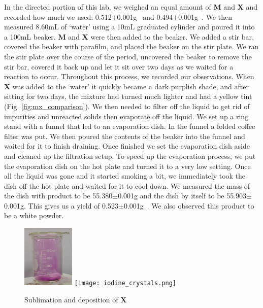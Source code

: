 \documentclass[titlepage]{article}
\begin{document}
In the directed portion of this lab, we weighed an equal amount of \textbf{M} and \textbf{X} and recorded how much we used: 0.512$\pm$0.001\unit{\gram{}} and 0.494$\pm$0.001\unit{\gram{}}. We then measured 8.60\unit{\milli\liter} of `water' using a 10\unit{\milli\liter} graduated cylinder and poured it into a 100\unit{\milli\liter} beaker. \textbf{M} and \textbf{X} were then added to the beaker. We added a stir bar, covered the beaker with parafilm, and placed the beaker on the stir plate. We ran the stir plate over the course of the period, uncovered the beaker to remove the stir bar, covered it back up and let it sit over two days as we waited for a reaction to occur. Throughout this process, we recorded our observations. When \textbf{X} was added to the `water' it quickly became a dark purplish shade, and after sitting for two days, the mixture had turned much lighter and had a yellow tint (Fig. \ref{fig:mx_comparison}). We then needed to filter off the liquid to get rid of impurities and unreacted solids then evaporate off the liquid. We set up a ring stand with a funnel that led to an evaporation dish. In the funnel a folded coffee filter was put. We then poured the contents of the beaker into the funnel and waited for it to finish draining. Once finished we set the evaporation dish aside and cleaned up the filtration setup. To speed up the evaporation process, we put the evaporation dish on the hot plate and turned it to a very low setting. Once all the liquid was gone and it started smoking a bit, we immediately took the dish off the hot plate and waited for it to cool down. We measured the mass of the dish with product to be 55.380$\pm$0.001\unit{\gram} and the dish by itself to be 55.903$\pm$0.001\unit{\gram}. This gives us a yield of 0.523$\pm$0.001\unit{\gram{}}. We also observed this product to be a white powder.

\begin{figure}[h]
    \centering
    \includegraphics[height=3cm]{iodine_gas.png}
    \texttt{[image: iodine\_crystals.png]} 
    \caption{Sublimation and deposition of \textbf{X}}
    \label{fig:heated_x}
\end{figure}
\end{document}
